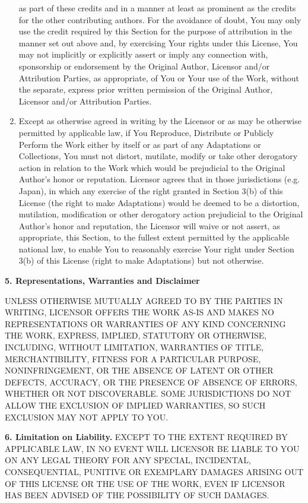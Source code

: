 \begin{enumerate}
  as part of these credits and in a manner at least as prominent as
  the credits for the other contributing authors. For the avoidance
  of doubt, You may only use the credit required by this Section for
  the purpose of attribution in the manner set out above and, by
  exercising Your rights under this License, You may not implicitly
  or explicitly assert or imply any connection with, sponsorship or
  endorsement by the Original Author, Licensor and/or Attribution
  Parties, as appropriate, of You or Your use of the Work, without
  the separate, express prior written permission of the Original
  Author, Licensor and/or Attribution Parties.
\item
  Except as otherwise agreed in writing by the Licensor or as may be
  otherwise permitted by applicable law, if You Reproduce, Distribute
  or Publicly Perform the Work either by itself or as part of any
  Adaptations or Collections, You must not distort, mutilate, modify
  or take other derogatory action in relation to the Work which would
  be prejudicial to the Original Author's honor or reputation.
  Licensor agrees that in those jurisdictions (e.g. Japan), in which
  any exercise of the right granted in Section 3(b) of this License
  (the right to make Adaptations) would be deemed to be a distortion,
  mutilation, modification or other derogatory action prejudicial to
  the Original Author's honor and reputation, the Licensor will waive
  or not assert, as appropriate, this Section, to the fullest extent
  permitted by the applicable national law, to enable You to
  reasonably exercise Your right under Section 3(b) of this License
  (right to make Adaptations) but not otherwise.
\end{enumerate}
\textbf{5. Representations, Warranties and Disclaimer}

UNLESS OTHERWISE MUTUALLY AGREED TO BY THE PARTIES IN WRITING,
LICENSOR OFFERS THE WORK AS-IS AND MAKES NO REPRESENTATIONS OR
WARRANTIES OF ANY KIND CONCERNING THE WORK, EXPRESS, IMPLIED,
STATUTORY OR OTHERWISE, INCLUDING, WITHOUT LIMITATION, WARRANTIES
OF TITLE, MERCHANTIBILITY, FITNESS FOR A PARTICULAR PURPOSE,
NONINFRINGEMENT, OR THE ABSENCE OF LATENT OR OTHER DEFECTS,
ACCURACY, OR THE PRESENCE OF ABSENCE OF ERRORS, WHETHER OR NOT
DISCOVERABLE. SOME JURISDICTIONS DO NOT ALLOW THE EXCLUSION OF
IMPLIED WARRANTIES, SO SUCH EXCLUSION MAY NOT APPLY TO YOU.

\textbf{6. Limitation on Liability.} EXCEPT TO THE EXTENT REQUIRED
BY APPLICABLE LAW, IN NO EVENT WILL LICENSOR BE LIABLE TO YOU ON
ANY LEGAL THEORY FOR ANY SPECIAL, INCIDENTAL, CONSEQUENTIAL,
PUNITIVE OR EXEMPLARY DAMAGES ARISING OUT OF THIS LICENSE OR THE
USE OF THE WORK, EVEN IF LICENSOR HAS BEEN ADVISED OF THE
POSSIBILITY OF SUCH DAMAGES.

